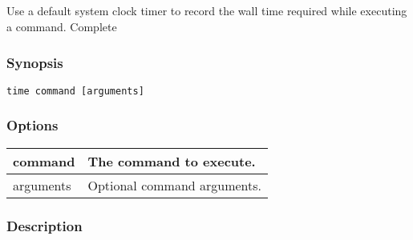 \subsection{}
\label{time}
Use a default system clock timer to record the wall time required while executing a command. 
 Complete
\subsubsection*{Synopsis}
\begin{verbatim}
time command [arguments]
\end{verbatim}
\subsubsection*{Options}
\begin{tabular}{|l|l|}
\hline 
 command  & The command to execute.  \\
 \hline 
 arguments  & Optional command arguments.  \\
 \hline 
\end{tabular}
\subsubsection*{Description}

